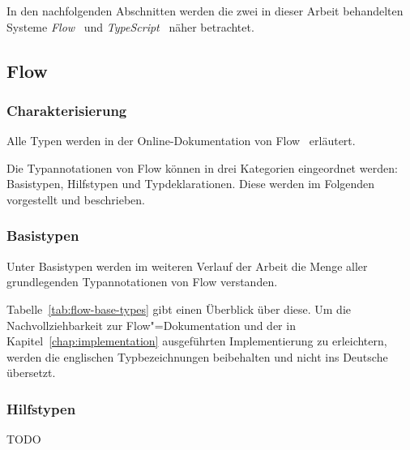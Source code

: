 


In den nachfolgenden Abschnitten werden die zwei in dieser Arbeit behandelten Systeme \textit{Flow}~\autocite{FLOW:PAPER} und \textit{TypeScript}~\autocite{TYPESCRIPT:SPEC} näher betrachtet.

\subsection{Flow}
\label{subsec:flow}

\subsubsection{Charakterisierung}

Alle Typen werden in der Online-Dokumentation von Flow~\autocite{FLOW:TYPE_ANNOTATIONS} erläutert.

Die Typannotationen von Flow können in drei Kategorien eingeordnet werden: Basistypen, Hilfstypen und Typdeklarationen. Diese werden im Folgenden vorgestellt und beschrieben.

\subsubsection{Basistypen}
\label{subsec:flow:base-types}

Unter Basistypen werden im weiteren Verlauf der Arbeit die Menge aller grundlegenden Typannotationen von Flow verstanden.


Tabelle~\ref{tab:flow-base-types} gibt einen Überblick über diese. Um die Nachvollziehbarkeit zur Flow"=Dokumentation und der in Kapitel~\ref{chap:implementation} ausgeführten Implementierung zu erleichtern, werden die englischen Typbezeichnungen beibehalten und nicht ins Deutsche übersetzt.

\bigbreak


\subsubsection{Hilfstypen}
\label{subsec:flow:utility-types}

TODO

\bigbreak


